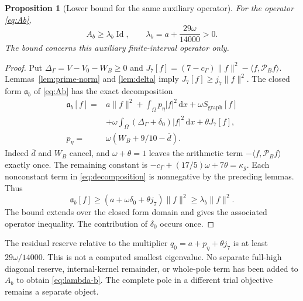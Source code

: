 \documentclass[11pt,a4paper]{article}
\newcommand{\Id}{\operatorname{Id}}
\newcommand{\ip}[2]{\langle #1,#2\rangle}
\newcommand{\norm}[1]{\lVert #1\rVert}
\newcommand{\dd}{\,\mathrm dx}
\newcommand{\peta}{p_{\eta}}
\newcommand{\dbar}{\overline d}
\newcommand{\Pp}{\mathcal P_B}
\newtheorem{proposition}[theorem]{Proposition}
\theoremstyle{remark}
\numberwithin{equation}{section}
\begin{document}
\begin{proposition}[Lower bound for the same auxiliary operator]\label{prop:lower}
For the operator \eqref{eq:Ab},
\begin{equation}\label{eq:lambda-b}
 A_b\ge\lambda_b\Id,\qquad
 \lambda_b=a+\frac{29\omega}{14000}>0.
\end{equation}
The bound concerns this auxiliary finite-interval operator only.
\end{proposition}
\begin{proof}
Put $\Delta_\Gamma=V-V_0-W_B\ge0$ and
$J_7[f]=(7-c_\Gamma)\norm{f}^2-\ip{f}{\Pp f}$.
Lemmas~\ref{lem:prime-norm} and \ref{lem:delta} imply
$J_7[f]\ge j_7\norm{f}^2$.
The closed form $\mathfrak a_b$ of \eqref{eq:Ab} has the exact decomposition
\begin{align}\label{eq:decomposition}
 \mathfrak a_b[f]={}&a\norm{f}^2+\int_\Omega\peta|f|^2\dd
       +\omega S_{\mathrm{graph}}[f]\\
 &+\omega\int_\Omega(\Delta_\Gamma+\delta_0)|f|^2\dd
       +\theta J_7[f],\nonumber\\
 \peta={}&\omega(W_B+9/10-\dbar).\nonumber
\end{align}
Indeed $\dbar$ and $W_B$ cancel, and $\omega+\theta=1$ leaves the
arithmetic term $-\ip{f}{\Pp f}$ exactly once. The remaining constant is
$-c_\Gamma+(17/5)\omega+7\theta=\kappa_g$.
Each nonconstant term in \eqref{eq:decomposition} is nonnegative by the
preceding lemmas. Thus
\[
 \mathfrak a_b[f]\ge
 (a+\omega\delta_0+\theta j_7)\norm{f}^2
 \ge\lambda_b\norm{f}^2.
\]
The bound extends over the closed form domain and gives the associated
operator inequality. The contribution of $\delta_0$ occurs once.
\end{proof}

The residual reserve relative to the multiplier
$q_0=a+\peta+\theta j_7$ is at least $29\omega/14000$.
This is not a computed smallest eigenvalue. No separate full-high diagonal
reserve, internal-kernel remainder, or whole-pole term has been added to
$A_b$ to obtain \eqref{eq:lambda-b}. The complete pole in a different trial
objective remains a separate object.
\end{document}
